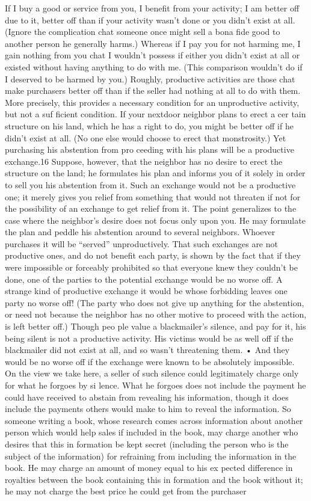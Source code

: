\documentclass[11pt,openany]{book}
\begin{document}
If I buy a good or service from you, I benefit from your activity; I am better off due to it, better off than if your activity wasn't done or you didn't exist at all. (Ignore the complication chat someone once might sell a bona fide good to another person he generally harms.) Whereas if I pay you for not harming me, I gain nothing from you chat I wouldn't possess if either you didn't exist at all or existed without having anything to do with me. (This comparison wouldn't do if I deserved to be harmed by you.) Roughly, productive activities are those chat make purchasers better off than if the seller had nothing at all to do with them. More precisely, this provides a necessary condition for an unproductive activity, but not a suf ficient condition. If your nextdoor neighbor plans to erect a cer tain structure on his land, which he has a right to do, you might be better off if he didn't exist at all. (No one else would choose to erect that monstrosity.) Yet purchasing his abstention from pro ceeding with his plans will be a productive exchange.16 Suppose, however, that the neighbor has no desire to erect the structure on the land; he formulates his plan and informs you of it solely in order to sell you his abstention from it. Such an exchange would not be a productive one; it merely gives you relief from something that would not threaten if not for the possibility of an exchange to get relief from it. The point generalizes to the case where the neighbor's desire does not focus only upon you. He may formulate the plan and peddle his abstention around to several neighbors. Whoever purchases it will be ``served'' unproductively. That such exchanges are not productive ones, and do not benefit each party, is shown by the fact that if they were impossible or forceably prohibited so that everyone knew they couldn't be done, one of the parties to the potential exchange would be no worse off. A strange kind of productive exchange it would be whose forbidding leaves one party no worse off! (The party who does not give up anything for the abstention, or need not because the neighbor has no other motive to proceed with the action, is left better off.) Though peo ple value a blackmailer's silence, and pay for it, his being silent is not a productive activity. His victims would be as well off if the blackmailer did not exist at all, and so wasn't threatening them. • And they would be no worse off if the exchange were known to be absolutely impossible. On the view we take here, a seller of such silence could legitimately charge only for what he forgoes by si lence. What he forgoes does not include the payment he could have received to abstain from revealing his information, though it does include the payments others would make to him to reveal the information. So someone writing a book, whose research comes across information about another person which would help sales if included in the book, may charge another who desires that this in formation be kept secret (including the person who is the subject of the information) for refraining from including the information in the book. He may charge an amount of money equal to his ex pected difference in royalties between the book containing this in formation and the book without it; he may not charge the best price he could get from the purchaser 
\end{document}
